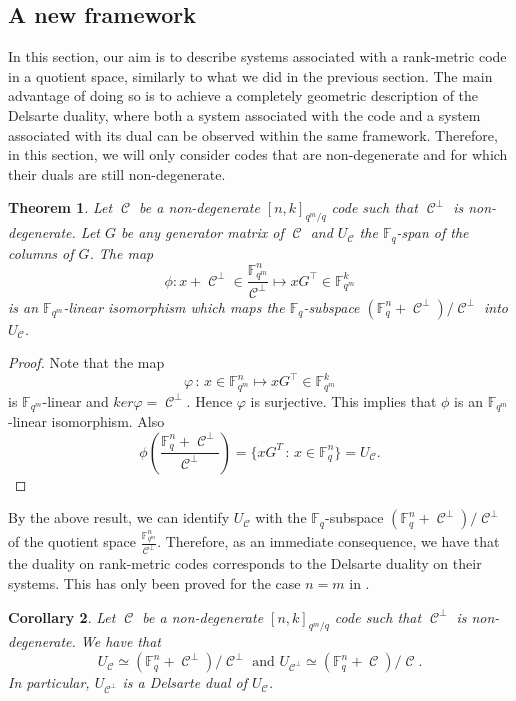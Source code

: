 \documentclass[11pt]{amsart}
\DeclareMathOperator{\C}{\mathcal{C}}
\newtheorem{theorem}{Theorem}[section]
\newtheorem{corollary}[theorem]{Corollary}
\newcommand{\F}{{\mathbb F}}
\newcommand{\fq}{{\mathbb F}_{q}}
\newcommand{\Fm}{\mathbb{F}_{q^m}}
\begin{document}
\subsection{A new framework}

In this section, our aim is to describe systems associated with a rank-metric code in a quotient space, similarly to what we did in the previous section. The main advantage of doing so is to achieve a completely geometric description of the Delsarte duality, where both a system associated with the code and a system associated with its dual can be observed within the same framework. Therefore, in this section, we will only consider codes that are non-degenerate and for which their duals are still non-degenerate.

\begin{theorem} \label{thm:isomorphism_systems}
    Let $\C$ be a non-degenerate $[n,k]_{q^m/q}$ code such that $\C^{\perp}$ is non-degenerate.
    Let $G$ be any generator matrix of $\C$ and $U_{\C}$ the $\fq$-span of the columns of $G$.
    The map
    \[\phi \colon x +\C^\perp \in \frac{\F_{q^m}^n}{\C^\perp} \mapsto xG^\top \in \F_{q^m}^k \]
    is an $\F_{q^m}$-linear isomorphism which maps the $\fq$-subspace $(\F_q^n+\C^\perp)/\C^\perp$ into $U_{\C}$.
\end{theorem}
\begin{proof} Note that the map
\[\varphi \,\colon\, x\in \F_{q^m}^n \mapsto xG^\top \in \F_{q^m}^k\]
     is   $\Fm$-linear and $ker \varphi = \C^\perp$. Hence $\varphi$ is surjective. This implies that $\phi$ is an $\F_{q^m}$-linear isomorphism. 
   Also 
    \[ \phi\left(\frac{\F_q^n+\C^\perp}{\C^\perp}\right)=\{xG^T\,\colon\, x\in \F_q^n\}= U_{\mathcal{C}}. \]
   
\end{proof}

By the above result, we can identify $U_{\C}$ with the $\fq$-subspace $(\F_q^n+\C^\perp)/\C^\perp$ of the quotient space $\frac{\F_{q^m}^n}{\C^\perp}$. Therefore, as an immediate consequence, we have that the duality on rank-metric codes corresponds to the Delsarte duality on their systems. This has only been proved for the case $n=m$ in \cite{lunardon2017mrd,sheekeyVdV}.

\begin{corollary}\label{cor:delsartedualitysubspaceandcode}
    Let $\C$ be a non-degenerate $[n,k]_{q^m/q}$ code such that $\C^{\perp}$ is non-degenerate. We have that
    \[ U_{\C}\simeq (\F_q^n+\C^\perp)/\C^\perp \,\,\text{and}\,\, U_{\C^\perp}\simeq (\F_q^n+\C)/\C.  \]
    In particular, $U_{\C^\perp}$ is a Delsarte dual of $U_{\C}$.
\end{corollary}
\end{document}
